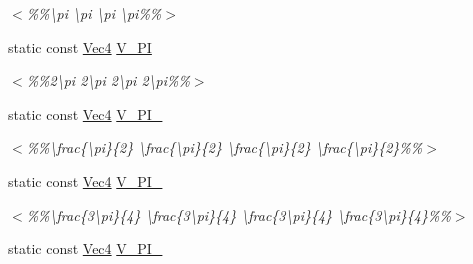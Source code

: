 \begin{DoxyCompactItemize}
\begin{DoxyCompactList}\small\item\em $<$\%\%\textbackslash{}pi \textbackslash{}pi \textbackslash{}pi \textbackslash{}pi\%\%$>$ \end{DoxyCompactList}\item 
\hypertarget{classgfxmath_1_1_vec4_a4babe450c295a50076268ccfdf119cf2}{}static const \hyperlink{classgfxmath_1_1_vec4}{Vec4} \hyperlink{classgfxmath_1_1_vec4_a4babe450c295a50076268ccfdf119cf2}{V\+\_\+P\+I}\label{classgfxmath_1_1_vec4_a4babe450c295a50076268ccfdf119cf2}

\begin{DoxyCompactList}\small\item\em $<$\%\%2\textbackslash{}pi 2\textbackslash{}pi 2\textbackslash{}pi 2\textbackslash{}pi\%\%$>$ \end{DoxyCompactList}\item 
\hypertarget{classgfxmath_1_1_vec4_a6ec2d2d3b85e523b5e2075a13f937948}{}static const \hyperlink{classgfxmath_1_1_vec4}{Vec4} \hyperlink{classgfxmath_1_1_vec4_a6ec2d2d3b85e523b5e2075a13f937948}{V\+\_\+\+P\+I\+\_}\label{classgfxmath_1_1_vec4_a6ec2d2d3b85e523b5e2075a13f937948}

\begin{DoxyCompactList}\small\item\em $<$\%\%\textbackslash{}frac\{\textbackslash{}pi\}\{2\} \textbackslash{}frac\{\textbackslash{}pi\}\{2\} \textbackslash{}frac\{\textbackslash{}pi\}\{2\} \textbackslash{}frac\{\textbackslash{}pi\}\{2\}\%\%$>$ \end{DoxyCompactList}\item 
\hypertarget{classgfxmath_1_1_vec4_acaa898a36077dffe1edaa57f507a900a}{}static const \hyperlink{classgfxmath_1_1_vec4}{Vec4} \hyperlink{classgfxmath_1_1_vec4_acaa898a36077dffe1edaa57f507a900a}{V\+\_\+P\+I\+\_}\label{classgfxmath_1_1_vec4_acaa898a36077dffe1edaa57f507a900a}

\begin{DoxyCompactList}\small\item\em $<$\%\%\textbackslash{}frac\{3\textbackslash{}pi\}\{4\} \textbackslash{}frac\{3\textbackslash{}pi\}\{4\} \textbackslash{}frac\{3\textbackslash{}pi\}\{4\} \textbackslash{}frac\{3\textbackslash{}pi\}\{4\}\%\%$>$ \end{DoxyCompactList}\item 
\hypertarget{classgfxmath_1_1_vec4_a9a9cdbaf70d5c37e79a57f9f4bab0513}{}static const \hyperlink{classgfxmath_1_1_vec4}{Vec4} \hyperlink{classgfxmath_1_1_vec4_a9a9cdbaf70d5c37e79a57f9f4bab0513}{V\+\_\+P\+I\+\_}\label{classgfxmath_1_1_vec4_a9a9cdbaf70d5c37e79a57f9f4bab0513}


\end{DoxyCompactItemize}
